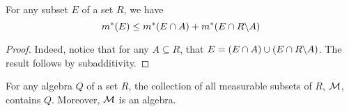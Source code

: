\begin{lemma}\label{lemma_10}
    For any subset $E$ of a set $R$, we have
    \begin{equation*}
        m^*(E) \leq m^*(E \cap A)+m^*(E \cap R\backslash A)
    \end{equation*}
\end{lemma}
\begin{proof}
    Indeed, notice that for any $A \subseteq R$, that $E=(E \cap A) \cup (E \cap
    R\backslash A)$. The result follows by subadditivity.
\end{proof}

\begin{theorem}\label{thoerem_11}
    For any algebra $Q$ of a set $R$, the collection of all measurable subsets
    of $R$, $\mathcal{M}$, contains $Q$. Moreover, $\mathcal{M}$ is an algebra.
\end{theorem}
